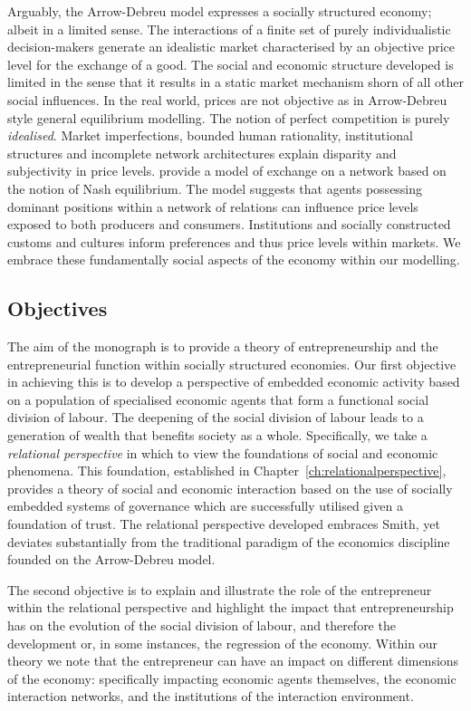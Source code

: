 Arguably, the Arrow-Debreu model expresses a socially structured economy; albeit in a limited sense. The interactions of a finite set of purely individualistic decision-makers generate an idealistic market characterised by an objective price level for the exchange of a good. The social and economic structure developed is limited in the sense that it results in a static market mechanism shorn of all other social influences. In the real world, prices are not objective as in Arrow-Debreu style general equilibrium modelling. The notion of perfect competition is purely \emph{idealised}. Market imperfections, bounded human rationality, institutional structures and incomplete network architectures explain disparity and subjectivity in price levels. \citet{Blume2009} provide a model of exchange on a network based on the notion of Nash equilibrium. The model suggests that agents possessing dominant positions within a network of relations can influence price levels exposed to both producers and consumers. Institutions and socially constructed customs and cultures inform preferences and thus price levels within markets. We embrace these fundamentally social aspects of the economy within our modelling.

\subsection{Objectives}

The aim of the monograph is to provide a theory of entrepreneurship and the entrepreneurial function within socially structured economies. Our first objective in achieving this is to develop a perspective of embedded economic activity based on a population of specialised economic agents that form a functional social division of labour. The deepening of the social division of labour leads to a generation of wealth that benefits society as a whole. Specifically, we take a \emph{relational perspective} in which to view the foundations of social and economic phenomena. This foundation, established in Chapter~\ref{ch:relationalperspective}, provides a theory of social and economic interaction based on the use of socially embedded systems of governance which are successfully utilised given a foundation of trust. The relational perspective developed embraces Smith, yet deviates substantially from the traditional paradigm of the economics discipline founded on the Arrow-Debreu model.

The second objective is to explain and illustrate the role of the entrepreneur within the relational perspective and highlight the impact that entrepreneurship has on the evolution of the social division of labour, and therefore the development or, in some instances, the regression of the economy. Within our theory we note that the entrepreneur can have an impact on different dimensions of the economy: specifically impacting economic agents themselves, the economic interaction networks, and the institutions of the interaction environment.

